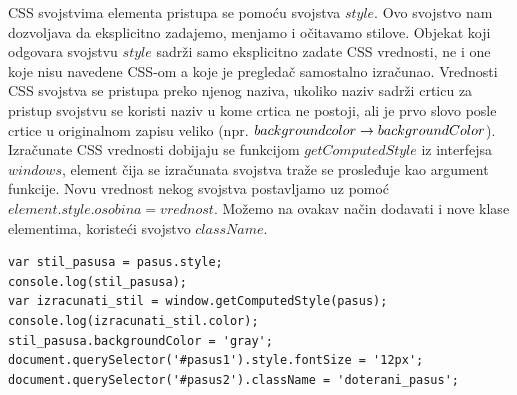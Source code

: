 
CSS svojstvima elementa pristupa se pomoću svojstva $style$. Ovo svojstvo nam dozvoljava da eksplicitno zadajemo, menjamo i očitavamo stilove. Objekat koji odgovara
svojstvu $style$ sadrži samo eksplicitno zadate CSS vrednosti, ne i one koje nisu
navedene CSS-om a koje je pregledač samostalno izračunao. Vrednosti CSS svojstva se
pristupa preko njenog naziva, ukoliko naziv sadrži crticu za pristup svojstvu se koristi
naziv u kome crtica ne postoji, ali je prvo slovo posle crtice u originalnom zapisu veliko
(npr. $background\-color  \rightarrow backgroundColor$). Izračunate CSS vrednosti dobijaju se
funkcijom $getComputedStyle$ iz interfejsa $windows$, element čija se izračunata svojstva
traže se prosleđuje kao argument funkcije. Novu vrednost nekog svojstva postavljamo uz pomoć $element.style.osobina = vrednost$. Možemo na ovakav način dodavati i nove klase elementima, koristeći svojstvo $className$.
\begin{lstlisting}[backgroundcolor = \color{lightgray}, breaklines=true]
var stil_pasusa = pasus.style;
console.log(stil_pasusa);
var izracunati_stil = window.getComputedStyle(pasus);
console.log(izracunati_stil.color);
stil_pasusa.backgroundColor = 'gray';
document.querySelector('#pasus1').style.fontSize = '12px';
document.querySelector('#pasus2').className = 'doterani_pasus';
\end{lstlisting} 	

